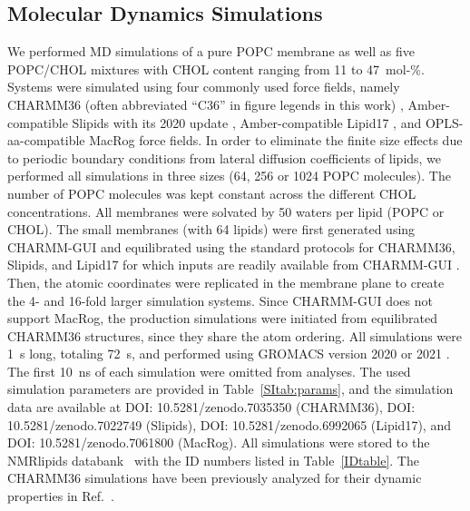 \documentclass[journal=jctcce]{achemso}
\begin{document}
\subsection{Molecular Dynamics Simulations}

We performed MD simulations of a pure POPC membrane as well as five POPC/CHOL mixtures with CHOL content ranging from 11 to 47~mol-\%. Systems were simulated using four commonly used force fields, namely CHARMM36 (often abbreviated ``C36'' in figure legends in this work) \cite{Klauda06,lim12}, Amber-compatible Slipids \cite{jambeck12,jambeck12b,jambeck13b} with its 2020 update \cite{grote2020optimization}, Amber-compatible Lipid17 \cite{dickson14,madej15}, and OPLS-aa-compatible MacRog \cite{kulig14,kulig15,Kulig16} force fields. In order to eliminate the finite size effects due to periodic boundary conditions from lateral diffusion coefficients of lipids, we performed all simulations in three sizes (64, 256 or 1024 POPC molecules). The number of POPC molecules was kept constant across the different CHOL concentrations. All membranes were solvated by 50 waters per lipid (POPC or CHOL). The small membranes (with 64 lipids) were first generated using CHARMM-GUI and equilibrated using the standard protocols for CHARMM36, Slipids, and Lipid17 for which inputs are readily available from CHARMM-GUI \cite{lee16,lee2020charmm}. Then, the atomic coordinates were replicated in the membrane plane to create the 4- and 16-fold larger simulation systems. Since CHARMM-GUI does not support MacRog, the production simulations were initiated from equilibrated CHARMM36 structures, since they share the atom ordering. All simulations were 1~\textmu{}s long, totaling 72~\textmu{}s, and performed using GROMACS version 2020 or 2021 \cite{pall2020heterogeneous}. The first 10~ns of each simulation were omitted from analyses. The used simulation parameters are provided in Table~\ref{SItab:params}, and the simulation data are available at DOI: 10.5281/zenodo.7035350 (CHARMM36), DOI: 10.5281/zenodo.7022749 (Slipids), DOI: 10.5281/zenodo.6992065 (Lipid17), and DOI: 10.5281/zenodo.7061800 (MacRog). All simulations were stored to the NMRlipids databank~\cite{NMRlipidsDatabank} with the ID numbers listed in Table~\ref{IDtable}. The CHARMM36 simulations have been previously analyzed for their dynamic properties in Ref.~.
\end{document}
